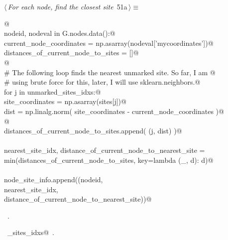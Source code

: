 \documentclass[11.5pt]{report}
\begin{document}
\vspace{-0.8cm} \newchunk
\begin{flushleft} \small
\begin{minipage}{\linewidth}\label{scrap75}\raggedright\small
{} $\langle\,${\itshape For each node, find the closest site}\nobreak\ {\footnotesize {51a}}$\,\rangle\equiv$
\vspace{-1ex}
\begin{list}{}{} \item
\mbox{}\verb@   @\\
\mbox{}\verb@for nodeid, nodeval in G.nodes.data():@\\
\mbox{}\verb@    current_node_coordinates = np.asarray(nodeval['mycoordinates'])@\\
\mbox{}\verb@    distances_of_current_node_to_sites = []@\\
\mbox{}\verb@               @\\
\mbox{}\verb@    # The following loop finds the nearest unmarked site. So far, I am @\\
\mbox{}\verb@    # using brute force for this, later, I will use sklearn.neighbors.@\\
\mbox{}\verb@    for j in unmarked_sites_idxs:@\\
\mbox{}\verb@        site_coordinates = np.asarray(sites[j])@\\
\mbox{}\verb@        dist             =  np.linalg.norm( site_coordinates - current_node_coordinates )@\\
\mbox{}\verb@                    @\\
\mbox{}\verb@        distances_of_current_node_to_sites.append( (j, dist) )@\\
\mbox{}\verb@@\\
\mbox{}\verb@        nearest_site_idx, distance_of_current_node_to_nearest_site = \@\\
\mbox{}\verb@                        min(distances_of_current_node_to_sites, key=lambda (_, d): d)@\\
\mbox{}\verb@@\\
\mbox{}\verb@        node_site_info.append((nodeid, \@\\
\mbox{}\verb@                                  nearest_site_idx, \@\\
\mbox{}\verb@                                  distance_of_current_node_to_nearest_site))@\\
\mbox{}\verb@@{\NWsep}
\end{list}
\vspace{-1.5ex}
\footnotesize
\begin{list}{}{\setlength{\itemsep}{-\parsep}\setlength{\itemindent}{-\leftmargin}}
\item \NWtxtMacroRefIn\ .
\item \NWtxtIdentsUsed\nobreak\  \verb@unmarked_sites_idxs@\nobreak\ .
\item{}
\end{list}
\end{minipage}\vspace{4ex}
\end{flushleft}
\end{document}
